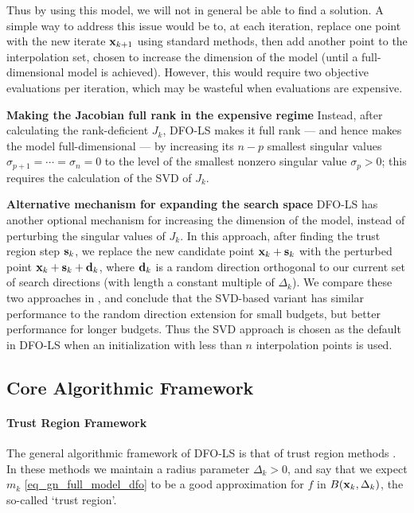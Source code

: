 Thus by using this model, we will not in general be able to find a solution.
A simple way to address this issue would be to, at each iteration, replace one point with the new iterate $\mathbf{x}_{k+1}$ using standard methods, then add another point to the interpolation set, chosen to increase the dimension of the model (until a full-dimensional model is achieved).
However, this would require two objective evaluations per iteration, which may be wasteful when evaluations are expensive.


{\bf Making the Jacobian full rank in the expensive regime}
Instead, after calculating the rank-deficient $J_k$, DFO-LS makes it full rank --- and hence makes the model full-dimensional --- by increasing its $n-p$ smallest singular values $\sigma_{p+1}=\cdots=\sigma_n=0$ to the level of the smallest nonzero singular value $\sigma_p>0$; this requires the calculation of the SVD of $J_k$.


{\bf Alternative mechanism for expanding the search space}
DFO-LS has another optional mechanism for increasing the dimension of the model, instead of perturbing the singular values of $J_k$.
In this approach, after finding the trust region step $\mathbf{s}_k$, we replace the new candidate point $\mathbf{x}_k+\mathbf{s}_k$ with the perturbed point $\mathbf{x}_k+\mathbf{s}_k+\mathbf{d}_k$, where $\mathbf{d}_k$ is a random direction orthogonal to our current set of search directions (with length a constant multiple of $\Delta_k$).
We compare these two approaches in , and conclude that the SVD-based variant  has similar performance to the random direction extension for small budgets, but better performance for longer budgets.
Thus the SVD approach is chosen as the default in DFO-LS when an initialization with less than $n$ interpolation points is used.

\subsection{Core Algorithmic Framework} \label{sec_main_algo}
\paragraph{Trust Region Framework}
The general algorithmic framework of DFO-LS is that of trust region methods \cite{Conn2000}.
In these methods we maintain a radius parameter $\Delta_k>0$, and say that we expect $m_k$ \eqref{eq_gn_full_model_dfo} to be a good approximation for $f$ in $B(\mathbf{x}_k,\Delta_k)$, the so-called `trust region'.

